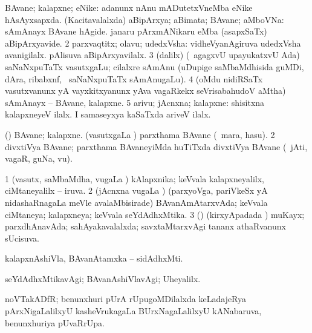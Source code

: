 \bentry
{}
\gl{\nA}
\bmng
\bnum
{} 
\banum
{} BAvane; kalapxne; eNike:  adanunx nAnu mADutetxVneMba eNike hAsAyxsapxda. 
 (Kacitavalalxda) aBipArxya; aBimata; BAvane; aMboVNa:  sAmAnayx BAvane hAgide.  janaru pArxmANikaru eMba (asapxSaTx) aBipArxyavide. 
\eanum
\numie
\num{2} parxvaqtitx; olavu; udedxVsha:  vidheVyanAgiruva udedxVsha avanigilalx.  pAlisuva aBipArxyavilalx. 
\num{3} (\bava dalilx) (\kanmu\ agagxvU upayukatxvU Ada) saNaNxpuTaTx vasutxgaLu; cilalxre sAmAnu (uDupige saMbaMdhisida guMDi, dAra, ribabxnf, \mo\ saNaNxpuTaTx sAmAnugaLu). 
\num{4} (oMdu nidiRSaTx vasutxvanunx yA vayxkitxyanunx yAva vagaRkekx seVrisabahudoV aMtha) sAmAnayx -- BAvane, kalapxne. 
\num{5} arivu; jAcnxna; kalapxne:  shisitxna kalapxneyeV ilalx.  I samaseyxya kaSaTxda ariveV ilalx. 
\enum
\emng

\noindent
\gl{\pagu}
\bmng
\bnum
{}  
\banum
{} (\takaR) BAvane; kalapxne. 
 (vasutxgaLa \vi) parxthama BAvane (\udA\ mara, hasu). 
\eanum
\numie
\num{2}  divxtiVya BAvane; parxthama BAvaneyiMda huTiTxda divxtiVya BAvane (\udA\ jAti, vagaR, guNa, \mo vu). 
\enum
\emng
\eentry

\bentry
{}
\gl{\gu}
\bmng
\bnum
\num{1} (vasutx, saMbaMdha, \mo vugaLa \vi) kAlapxnika; keVvala kalapxneyalilx, ciMtaneyalilx -- iruva. 
\num{2} (jAcnxna \mo vugaLa \vi) (parxyoVga, pariVkeSx yA nidashaRnagaLa meVle avalaMbisirade) BAvanAmAtarxvAda; keVvala ciMtaneya; kalapxneya; keVvala seYdAdhxMtika. 
\num{3} (\vAyx) (kirxyApadada \vi) muKayx; parxdhAnavAda; sahAyakavalalxda; savxtaMtarxvAgi tananx athaRvanunx sUcisuva. 
\enum
\emng
\eentry

\bentry
{}
\gl{\nA}
\bmng
kalapxnAshiVla, BAvanAtamxka -- sidAdhxMti. 
\emng
\eentry

\bentry
{}
\gl{\kirxvi}
\bmng
seYdAdhxMtikavAgi; BAvanAshiVlavAgi; Uheyalilx. 
\emng
\eentry

\bentry
{}
\gl{\nA}
\bmng
noVTakADfR; benunxhuri pUrA rUpugoMDilalxda keLadajeRya pArxNigaLalilxyU kasheVrukagaLa BUrxNagaLalilxyU kANabaruva, benunxhuriya pUvaRrUpa. 
\emng
\eentry

